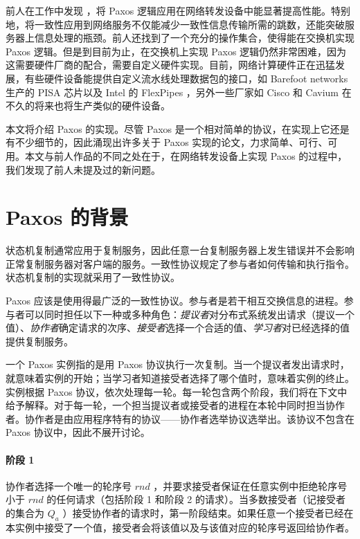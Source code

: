 \documentclass[conference]{IEEEtran}
\begin{document}
前人在工作中发现 \cite{b8} ，将 Paxos 逻辑应用在网络转发设备中能显著提高性能。特别地，将一致性应用到网络服务不仅能减少一致性信息传输所需的跳数，还能突破服务器上信息处理的瓶颈。前人还找到了一个充分的操作集合，使得能在交换机实现 Paxos 逻辑。但是到目前为止，在交换机上实现 Paxos 逻辑仍然非常困难，因为这需要硬件厂商的配合，需要自定义硬件实现。目前，网络计算硬件正在迅猛发展，有些硬件设备能提供自定义流水线处理数据包的接口，如 Barefoot networks \cite{b2} 生产的 PISA 芯片以及 Intel 的 FlexPipes \cite{b11} ，另外一些厂家如 Cisco 和 Cavium 在不久的将来也将生产类似的硬件设备。

本文将介绍 Paxos 的实现。尽管 Paxos 是一个相对简单的协议，在实现上它还是有不少细节的，因此涌现出许多关于 Paxos 实现的论文，力求简单\cite{b14}、可行\cite{b17}、可用\cite{b6}。本文与前人作品的不同之处在于，在网络转发设备上实现 Paxos 的过程中，我们发现了前人未提及过的新问题。

\section{Paxos 的背景}

状态机复制通常应用于复制服务，因此任意一台复制服务器上发生错误并不会影响正常复制服务器对客户端的服务。一致性协议规定了参与者如何传输和执行指令。状态机复制的实现就采用了一致性协议。

Paxos \cite{b13} 应该是使用得最广泛的一致性协议。参与者是若干相互交换信息的进程。参与者可以同时担任以下一种或多种角色：\emph{提议者}对分布式系统发出请求（提议一个值）、\emph{协作者}确定请求的次序、\emph{接受者}选择一个合适的值、\emph{学习者}对已经选择的值提供复制服务。

一个 Paxos 实例指的是用 Paxos 协议执行一次复制。当一个提议者发出请求时，就意味着实例的开始；当学习者知道接受者选择了哪个值时，意味着实例的终止。实例根据 Paxos 协议，依次处理每一轮。每一轮包含两个阶段，我们将在下文中给予解释。对于每一轮，一个担当提议者或接受者的进程在本轮中同时担当协作者。协作者是由应用程序特有的协议——协作者选举协议选举出。该协议不包含在 Paxos 协议中，因此不展开讨论。

\paragraph{阶段 1}
协作者选择一个唯一的轮序号 $rnd$ ，并要求接受者保证在任意实例中拒绝轮序号小于 $rnd$ 的任何请求（包括阶段 1 和阶段 2 的请求）。当多数接受者（记接受者的集合为 $Q_a$ ）接受协作者的请求时，第一阶段结束。如果任意一个接受者已经在本实例中接受了一个值，接受者会将该值以及与该值对应的轮序号返回给协作者。
\end{document}
